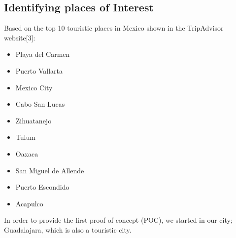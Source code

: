 \subsection{Identifying places of Interest}
Based on the top 10 touristic places in Mexico shown in the TripAdvisor website[3]: \\

\begin{itemize}
  \item Playa del Carmen
  \item Puerto Vallarta
  \item Mexico City
  \item Cabo San Lucas
  \item Zihuatanejo
  \item Tulum
  \item Oaxaca
  \item San Miguel de Allende
  \item Puerto Escondido
  \item Acapulco
\end{itemize}

In order to provide the first proof of concept (POC), we started in our city; 
Guadalajara, which is also a  touristic city.

